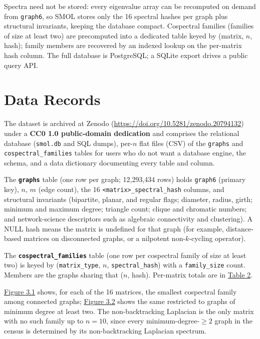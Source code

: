 \documentclass[
]{article}
\begin{document}
Spectra need not be stored: every eigenvalue array can be recomputed on
demand from \texttt{graph6}, so SMOL stores only the 16 spectral hashes
per graph plus structural invariants, keeping the database compact.
Cospectral families (families of size at least two) are precomputed into
a dedicated table keyed by (matrix, \(n\), hash); family members are
recovered by an indexed lookup on the per-matrix hash column. The full
database is PostgreSQL; a SQLite export drives a public query API.

\section{Data Records}\label{sec-records}

The dataset is archived at Zenodo
(\url{https://doi.org/10.5281/zenodo.20794132}) under a \textbf{CC0 1.0
public-domain dedication} and comprises the relational database
(\texttt{smol.db} and SQL dumps), per-\(n\) flat files (CSV) of the
\texttt{graphs} and \texttt{cospectral\_families} tables for users who
do not want a database engine, the schema, and a data dictionary
documenting every table and column.

The \textbf{\texttt{graphs}} table (one row per graph; 12,293,434 rows)
holds \texttt{graph6} (primary key), \(n\), \(m\) (edge count), the 16
\texttt{\textless{}matrix\textgreater{}\_spectral\_hash} columns, and
structural invariants (bipartite, planar, and regular flags; diameter,
radius, girth; minimum and maximum degree; triangle count; clique and
chromatic numbers; and network-science descriptors such as algebraic
connectivity and clustering). A NULL hash means the matrix is undefined
for that graph (for example, distance-based matrices on disconnected
graphs, or a nilpotent non-\(k\)-cycling operator).

The \textbf{\texttt{cospectral\_families}} table (one row per cospectral
family of size at least two) is keyed by (\texttt{matrix\_type}, \(n\),
\texttt{spectral\_hash}) with a \texttt{family\_size} count. Members are
the graphs sharing that (\(n\), hash). Per-matrix totals are in
\hyperref[tbl-matrices]{Table 2}.

\hyperref[fig-connected]{Figure 3.1} shows, for each of the 16 matrices,
the smallest cospectral family among connected graphs;
\hyperref[fig-mindeg2]{Figure 3.2} shows the same restricted to graphs
of minimum degree at least two. The non-backtracking Laplacian is the
only matrix with no such family up to \(n = 10\), since every
minimum-degree-\(\ge 2\) graph in the census is determined by its
non-backtracking Laplacian spectrum.
\end{document}
